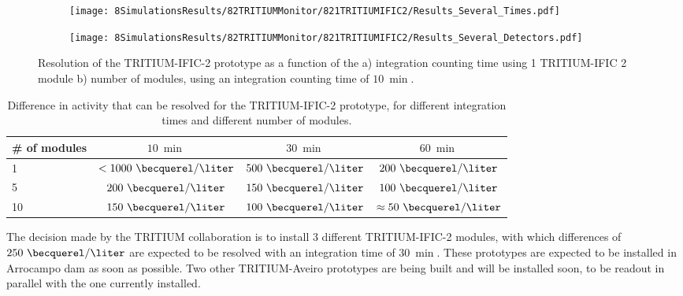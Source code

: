 \begin{figure}
\centering
    \begin{subfigure}[b]{0.75\textwidth}
    \centering
    \texttt{[image: 8SimulationsResults/82TRITIUMMonitor/821TRITIUMIFIC2/Results\_Several\_Times.pdf]}  
    \caption{\label{subfig:ResolutionvsIntegrationCoutingTime}}
    \end{subfigure}
    \hfill
    \begin{subfigure}[b]{0.75\textwidth}
    \centering
    \texttt{[image: 8SimulationsResults/82TRITIUMMonitor/821TRITIUMIFIC2/Results\_Several\_Detectors.pdf]}  
    \caption{\label{subfig:ResolutionvsNumberDetectors}}
    \end{subfigure}
 \caption{Resolution of the TRITIUM-IFIC-2 prototype as a function of the a) integration counting time using 1 TRITIUM-IFIC 2 module b) number of modules, using an integration counting time of $10~\min$.}
 \label{fig:Resolution}
\end{figure}

\begin{table}[htbp]
\centering{}%
\begin{tabular}{lccc}
\toprule 
\# of modules & $10~\min$ & $30~\min$ & $60~\min$ \tabularnewline
\midrule
\midrule 
1 & $<1000~\becquerel/\liter$ & $500~\becquerel/\liter$ & $200~\becquerel/\liter$ \tabularnewline
5 & $200~\becquerel/\liter$ & $150~\becquerel/\liter$ & $100~\becquerel/\liter$ \tabularnewline
10 & $150~\becquerel/\liter$ & $100~\becquerel/\liter$ & $\approx 50~\becquerel/\liter$ \tabularnewline
\bottomrule
\end{tabular}
\caption{Difference in activity that can be resolved for the TRITIUM-IFIC-2 prototype, for different integration times and different number of modules.}
\label{tab:DifferentCasesOfTI2}
\end{table}

The decision made by the TRITIUM collaboration is to install 3 different TRITIUM-IFIC-2 modules, with which differences of $250~\becquerel/\liter$ are expected to be resolved with an integration time of $30~\min$. These prototypes are expected to be installed  in Arrocampo dam as soon as possible. Two other TRITIUM-Aveiro prototypes are being built and will be installed soon, to be readout in parallel with the one currently installed.


